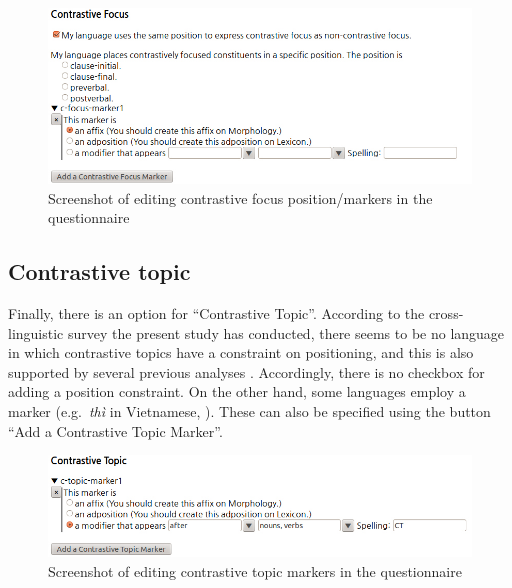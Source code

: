 \begin{figure}[!t]
\begin{center} 
\includegraphics[width=.9\textwidth]{screenshot/cf.jpg}
\caption{Screenshot of editing contrastive focus position/markers in the questionnaire}
\label{screenshot:cf}
\end{center}
\end{figure}


\subsection{Contrastive topic}
\label{11:ssec:questionnaire-ct}

Finally, there is an option for ``Contrastive Topic''. According to the cross-lin\-guis\-tic survey the present study
has conducted, there seems to be no language in which contrastive
topics have a constraint on positioning, and this is also supported by
several previous analyses
\citep{choi:99,erteschik:07,bianchi:frascarelli:10}. Accordingly,
there is no checkbox for adding a position constraint. On the other
hand, some languages employ a  marker
(e.g.\ \textit{th{\`i}} in Vietnamese, \citealt{nguyen:06}). These can
also be specified using the button ``Add a Contrastive Topic Marker''.

\begin{figure}[!t]
\begin{center} 
\includegraphics[width=.9\textwidth]{screenshot/ct.jpg}
\caption{Screenshot of editing contrastive topic markers in the questionnaire}
\label{screenshot:ct}
\end{center}
\end{figure}



